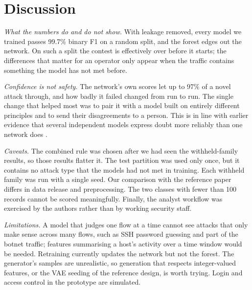 \documentclass[conference]{IEEEtran}
\begin{document}
\section{Discussion}
\textit{What the numbers do and do not show.} With leakage removed, every model we trained passes
99.7\% binary F1 on a random split, and the forest edges out the network. On such a split the
contest is effectively over before it starts; the differences that matter for an operator only
appear when the traffic contains something the model has not met before.

\textit{Confidence is not safety.} The network's own scores let up to 97\% of a novel attack
through, and how badly it failed changed from run to run. The single change that helped most was
to pair it with a model built on entirely different principles and to send their disagreements to
a person. This is in line with earlier evidence that several independent models express doubt
more reliably than one network does \cite{lakshminarayanan2017simple}.

\textit{Caveats.} The combined rule was chosen after we had seen the withheld-family results, so
those results flatter it. The test partition was used only once, but it contains no attack type
that the models had not met in training. Each withheld family was run with a single seed. Our
comparison with the reference paper differs in data release and preprocessing. The two classes
with fewer than 100 records cannot be scored meaningfully. Finally, the analyst workflow was
exercised by the authors rather than by working security staff.

\textit{Limitations.} A model that judges one flow at a time cannot see attacks that only make
sense across many flows, such as SSH password guessing and part of the botnet traffic; features
summarising a host's activity over a time window would be needed. Retraining currently updates
the network but not the forest. The generator's samples are unrealistic, so generation that
respects integer-valued features, or the VAE seeding of the reference design, is worth trying.
Login and access control in the prototype are simulated.

\end{document}
